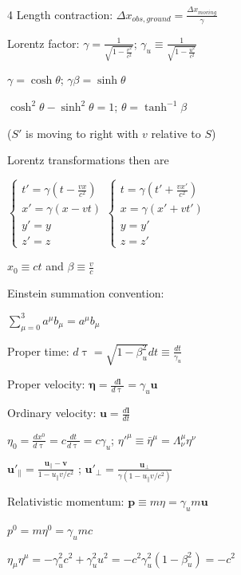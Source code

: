 \documentclass[a4paper,twoside]{article}
\begin{document}
\begin{multicols*}{4}
Length contraction:
\(\Delta x_{obs, ground} = \frac{\Delta x_{moving}}{\gamma}\)

Lorentz factor:
\(\gamma = \frac{1}{\sqrt{1 - \frac{v^2}{c^2}}}\);
\(\gamma_u \equiv \frac{1}{\sqrt{1 - \frac{u^2}{c^2}}}\)

\(\gamma = \cosh\theta\); \(\gamma\beta = \sinh\theta\)

\(\cosh^2\theta - \sinh^2\theta = 1\); \(\theta = \tanh^{-1} \beta\)


(\(S'\) is moving to right with \(v\) relative to \(S\))

Lorentz transformations then are

\(\begin{cases}
    t' = \gamma (t -  \frac{v x}{c^2}) \\
    x' = \gamma (x - vt) \\
    y' = y \\
    z' = z
\end{cases}
\begin{cases}
    t = \gamma (t' + \frac{v x'}{c^2}) \\
    x = \gamma (x' + vt') \\
    y = y' \\
    z = z'
\end{cases}\)

\(x_0 \equiv ct\) and \(\beta \equiv \frac{v}{c}\)

Einstein summation convention:

\(\sum_{\mu=0}^3 a^\mu b_\mu = a^\mu b_\mu\)

Proper time:
\(d\uptau = \sqrt{1 - \beta_u^2}dt \equiv \frac{dt}{\gamma_u}\)

Proper velocity:
\(\bm \eta = \frac{d\bm l}{d\uptau} = \gamma_u \bm u\)

Ordinary velocity:
\(\bm u = \frac{d\bm l}{dt}\)

\(\eta_0 = \frac{dx^0}{d\uptau} = c \frac{dt}{d\uptau} = c\gamma_u\);
\(\eta'^\mu \equiv \bar{\eta}^\mu = \Lambda_\nu^\mu \eta^\nu\)

\(\bm u'_\parallel = \frac{\bm u_\parallel-\bm v}{1 - u_\parallel v/c^2}\) ; \(\bm u'_\perp = \frac{\bm u_\perp}{\gamma (1 - u_\parallel v/c^2)}\)

Relativistic momentum:
\(\bm p \equiv  m \eta =  \gamma_u m \bm u\)

\(p^0 = m\eta^0 = \gamma_u mc\)

\(\eta_\mu \eta^\mu = - \gamma_u^2 c^2 + \gamma_u^2 u^2 = -c^2\gamma_u^2(1-\beta_u^2) = -c^2\)


\end{multicols*}
\end{document}

